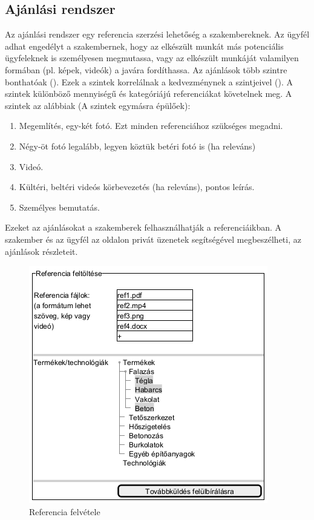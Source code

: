 \subsection{Ajánlási rendszer}
Az ajánlási rendszer egy referencia szerzési lehetőség a szakembereknek. Az ügyfél adhat engedélyt a szakembernek, hogy az elkészült munkát más potenciális ügyfeleknek is személyesen megmutassa, vagy az elkészült munkáját valamilyen formában (pl. képek, videók) a javára fordíthassa. Az ajánlások több szintre bonthatóak (). Ezek a szintek korrelálnak a kedvezménynek a szintjeivel (). A szintek különböző mennyiségű és kategóriájú referenciákat követelnek meg. A szintek az alábbiak (A szintek egymásra épülőek):
\begin{enumerate}
  \item Megemlítés, egy-két fotó. Ezt minden referenciához szükséges megadni.
  \item Négy-öt fotó legalább, legyen köztük betéri fotó is (ha releváns)
  \item Videó.
  \item Kültéri, beltéri videós körbevezetés (ha releváns), pontos leírás.
  \item Személyes bemutatás.
\end{enumerate}
Ezeket az ajánlásokat a szakemberek felhasználhatják a referenciáikban. A szakember és az ügyfél az oldalon privát üzenetek segítségével megbeszélheti, az ajánlások részleteit.

\begin{figure}[h]
	\centering
	\includegraphics[scale=0.5]{img/referenciak.png}
	\caption*{Referencia felvétele}
	\label{fig:ref}
\end{figure}